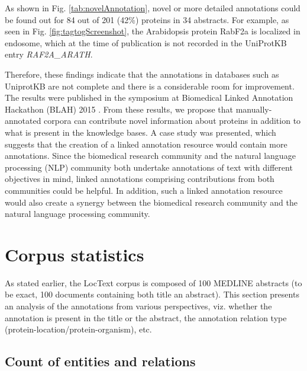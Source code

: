 
As shown in Fig. \ref{tab:novelAnnotation}, novel or more detailed annotations could be found out for 84 out of 201 (42\%) proteins in 34 abstracts. For example, as seen in Fig. \ref{fig:tagtogScreenshot}, the Arabidopsis protein RabF2a is localized in endosome, which at the time of publication is not recorded in the UniProtKB entry \emph{RAF2A\_ARATH}.

Therefore, these findings indicate that the annotations in databases such as UniprotKB are not complete and there is a considerable room for improvement. The results \cite{goldberg2015linked} were published in the symposium at Biomedical Linked Annotation Hackathon (BLAH) 2015 \cite{blah}. From these results, we propose that manually-annotated corpora can contribute novel information about proteins in addition to what is present in the knowledge bases. A case study was presented, which suggests that the creation of a linked annotation resource would contain more annotations. Since the biomedical research community and the natural language processing (NLP) community both undertake annotations of text with different objectives in mind, linked annotations comprising contributions from both communities could be helpful. In addition, such a linked annotation resource would also create a synergy between the biomedical research community and the natural language processing community.


\section{Corpus statistics}\label{sec:corpusStats}


As stated earlier, the LocText corpus is composed of 100 MEDLINE abstracts (to be exact, 100 documents containing both title an abstract). This section presents an analysis of the annotations from various perspectives, viz. whether the annotation is present in the title or the abstract, the annotation relation type (protein-location/protein-organism), etc.

\subsection*{Count of entities and relations}

